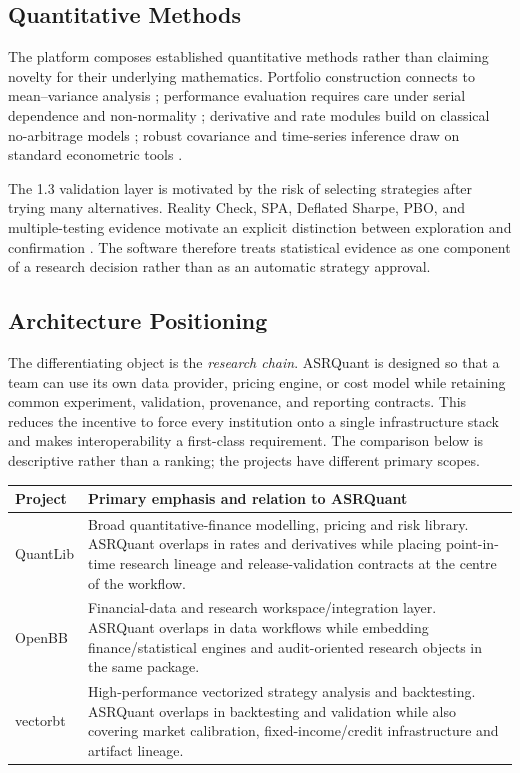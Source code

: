 \documentclass{asrpaper}
\begin{document}
\subsection{Quantitative Methods}
The platform composes established quantitative methods rather than claiming novelty for their underlying mathematics. Portfolio construction connects to mean--variance analysis \cite{markowitz1952}; performance evaluation requires care under serial dependence and non-normality \cite{sharpe1966,lo2002}; derivative and rate modules build on classical no-arbitrage models \cite{blackscholes1973,merton1973,vasicek1977,cir1985,heston1993}; robust covariance and time-series inference draw on standard econometric tools \cite{neweywest1987,englegranger1987,ledoitwolf2004}.

The 1.3 validation layer is motivated by the risk of selecting strategies after trying many alternatives. Reality Check, SPA, Deflated Sharpe, PBO, and multiple-testing evidence motivate an explicit distinction between exploration and confirmation \cite{white2000,hansen2005,bailey2014,bailey2017,harvey2016}. The software therefore treats statistical evidence as one component of a research decision rather than as an automatic strategy approval.

\subsection{Architecture Positioning}
The differentiating object is the \emph{research chain}. ASRQuant is designed so that a team can use its own data provider, pricing engine, or cost model while retaining common experiment, validation, provenance, and reporting contracts. This reduces the incentive to force every institution onto a single infrastructure stack and makes interoperability a first-class requirement.
The comparison below is descriptive rather than a ranking; the projects have different primary scopes.
\begin{center}\small
\begin{tabularx}{\columnwidth}{@{}p{}X@{}}
\toprule
\textbf{Project} & \textbf{Primary emphasis and relation to ASRQuant} \\
\midrule
QuantLib & Broad quantitative-finance modelling, pricing and risk library. ASRQuant overlaps in rates and derivatives while placing point-in-time research lineage and release-validation contracts at the centre of the workflow. \\
OpenBB & Financial-data and research workspace/integration layer. ASRQuant overlaps in data workflows while embedding finance/statistical engines and audit-oriented research objects in the same package. \\
vectorbt & High-performance vectorized strategy analysis and backtesting. ASRQuant overlaps in backtesting and validation while also covering market calibration, fixed-income/credit infrastructure and artifact lineage. \\
\bottomrule
\end{tabularx}
\end{center}
\end{document}
